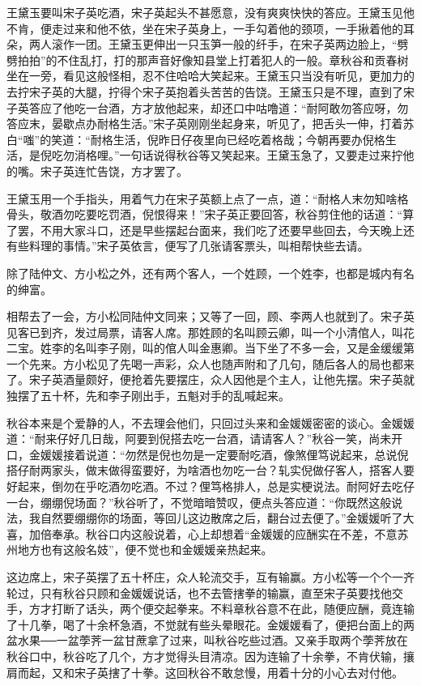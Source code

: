 \documentclass[12pt,UTF8]{ctexbook}
\begin{document}
{{{王黛玉要叫宋子英吃酒，宋子英起头不甚愿意，没有爽爽快快的答应。王黛玉见他不肯，便走过来和他不依，坐在宋子英身上，一手勾着他的颈项，一手揪着他的耳朵，两人滚作一团。王黛玉更伸出一只玉笋一般的纤手，在宋子英两边脸上，“劈劈拍拍”的不住乱打，打的那声音好像知县堂上打着犯人的一般。章秋谷和贡春树坐在一旁，看见这般怪相，忍不住哈哈大笑起来。王黛玉只当没有听见，更加力的去拧宋子英的大腿，拧得个宋子英抱着头苦苦的告饶。王黛玉只是不理，直到了宋子英答应了他吃一台酒，方才放他起来，却还口中咕噜道：“耐阿敢勿答应呀，勿答应末，晏歇点办耐格生活。”宋子英刚刚坐起身来，听见了，把舌头一伸，打着苏白“嗤”的笑道：“耐格生活，倪昨日仔夜里向已经吃着格哉；今朝再要办倪格生活，是倪吃勿消格哩。”一句话说得秋谷等又笑起来。王黛玉急了，又要走过来拧他的嘴。宋子英连忙告饶，方才罢了。

王黛玉用一个手指头，用着气力在宋子英额上点了一点，道：“耐格人末勿知啥格骨头，敬酒勿吃要吃罚酒，倪恨得来！”宋子英正要回答，秋谷剪住他的话道：“算了罢，不用大家斗口，还是早些摆起台面来，我们吃了还要早些回去，今天晚上还有些料理的事情。”宋子英依言，便写了几张请客票头，叫相帮快些去请。

除了陆仲文、方小松之外，还有两个客人，一个姓顾，一个姓李，也都是城内有名的绅富。

相帮去了一会，方小松同陆仲文同来；又等了一回，顾、李两人也就到了。宋子英见客已到齐，发过局票，请客人席。那姓顾的名叫顾云卿，叫一个小清倌人，叫花二宝。姓李的名叫李子刚，叫的倌人叫金惠卿。当下坐了不多一会，又是金缓缓第一个先来。方小松见了先喝一声彩，众人也随声附和了几句，随后各人的局也都来了。宋子英酒量颇好，便抢着先要摆庄，众人因他是个主人，让他先摆。宋子英就独摆了五十杯，先和李子刚出手，五魁对手的乱喊起来。

秋谷本来是个爱静的人，不去理会他们，只回过头来和金媛媛密密的谈心。金媛媛道：“耐来仔好几日哉，阿要到倪搭去吃一台酒，请请客人？”秋谷一笑，尚未开口，金媛媛接着说道：“勿然是倪也勿是一定要耐吃酒，像煞俚笃说起来，总说倪搭仔耐两家头，做末做得蛮要好，为啥酒也勿吃一台？轧实倪做仔客人，搭客人要好起来，倒勿在乎吃酒勿吃酒。不过？俚笃格排人，总是实梗说法。耐阿好去吃仔一台，绷绷倪场面？”秋谷听了，不觉暗暗赞叹，便点头答应道：“你既然这般说法，我自然要绷绷你的场面，等回儿这边散席之后，翻台过去便了。”金媛媛听了大喜，加倍奉承。秋谷口内这般说着，心上却想着“金媛媛的应酬实在不差，不意苏州地方也有这般名妓”，便不觉也和金媛媛亲热起来。

这边席上，宋子英摆了五十杯庄，众人轮流交手，互有输赢。方小松等一个个一齐轮过，只有秋谷只顾和金媛媛说话，也不去管搳拳的输赢，直至宋子英要找他交手，方才打断了话头，两个便交起拳来。不料章秋谷意不在此，随便应酬，竟连输了十几拳，喝了十余杯急酒，不觉就有些头晕眼花。金媛媛看了，便把台面上的两盆水果──一盆荸荠一盆甘蔗拿了过来，叫秋谷吃些过酒。又亲手取两个荸荠放在秋谷口中，秋谷吃了几个，方才觉得头目清凉。因为连输了十余拳，不肯伏输，攘肩而起，又和宋子英搳了十拳。这回秋谷不敢怠慢，用着十分的小心去对付他。

}}}
\end{document}
